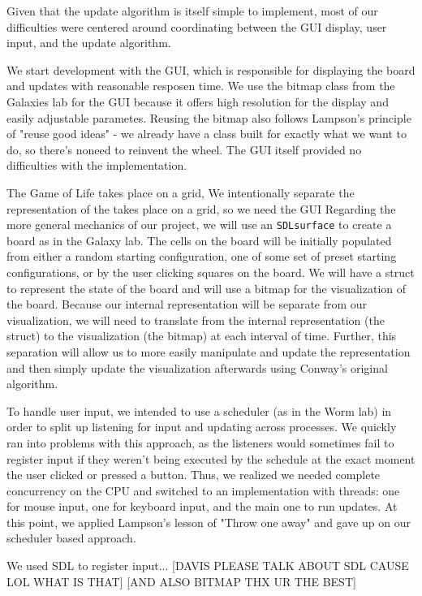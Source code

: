 \documentclass[12pt]{article}
\begin{document}
	Given that the update algorithm is itself simple to implement, most of our difficulties were centered around coordinating between the GUI display, user input, and the update algorithm.	
	
	We start development with the GUI, which is responsible for displaying the board and updates with reasonable resposen time. We use the bitmap class from the Galaxies lab for the GUI because it offers high resolution for the display and easily adjustable parametes. Reusing the bitmap also follows Lampson's principle of "reuse good ideas" - we already have a class built for exactly what we want to do, so there's noneed to reinvent the wheel. The GUI itself provided no difficulties with the implementation. 
	
	The Game of Life takes place on a grid, We intentionally separate the representation of the  takes place on a grid, so we need the GUI Regarding the more general mechanics of our project, we will use an \texttt{SDL\underline{\hspace{3mm}}surface} to create a board as in the Galaxy lab. The cells on the board will be initially populated from either a random starting configuration, one of some set of preset starting configurations, or by the user clicking squares on the board. We will have a struct to represent the state of the board and will use a bitmap for the visualization of the board. Because our internal representation will be separate from our visualization, we will need to translate from the internal representation (the struct) to the visualization (the bitmap) at each interval of time. Further, this separation will allow us to more easily manipulate and update the representation and then simply update the visualization afterwards using Conway's original algorithm.
	
	To handle user input, we intended to use a scheduler (as in the Worm lab) in order to split up listening for input and updating across processes. We quickly ran into problems with this approach, as the listeners would sometimes fail to register input if they weren't being executed by the schedule at the exact moment the user clicked or pressed a button. Thus, we realized we needed complete concurrency on the CPU and switched to an implementation with threads: one for mouse input, one for keyboard input, and the main one to run updates. At this point, we applied Lampson's lesson of "Throw one away" and gave up on our scheduler based approach.
	
	We used SDL to register input... [DAVIS PLEASE TALK ABOUT SDL CAUSE LOL WHAT IS THAT] [AND ALSO BITMAP THX UR THE BEST]
	
\end{document}
